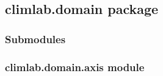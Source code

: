 \documentclass[letterpaper,10pt,english]{sphinxmanual}
\begin{document}
\subsection{climlab.domain package}
\label{api/climlab.domain:climlab-domain-package}\label{api/climlab.domain::doc}

\subsubsection{Submodules}
\label{api/climlab.domain:submodules}

\subsubsection{climlab.domain.axis module}
\label{api/climlab.domain:climlab-domain-axis-module}\label{api/climlab.domain:module-climlab.domain.axis}
\end{document}
